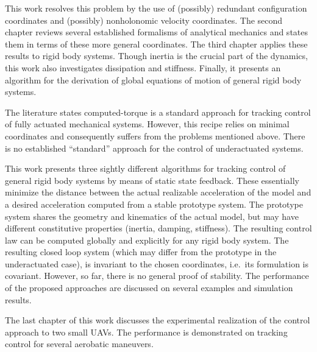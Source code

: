 This work resolves this problem by the use of (possibly) redundant configuration coordinates and (possibly) nonholonomic velocity coordinates.
The second chapter reviews several established formalisms of analytical mechanics and states them in terms of these more general coordinates.
The third chapter applies these results to rigid body systems.
Though inertia is the crucial part of the dynamics, this work also investigates dissipation and stiffness.
Finally, it presents an algorithm for the derivation of global equations of motion of general rigid body systems.

The literature states computed-torque is a standard approach for tracking control of fully actuated mechanical systems.
However, this recipe relies on minimal coordinates and consequently suffers from the problems mentioned above.
There is no established ``standard'' approach for the control of underactuated systems.

This work presents three sightly different algorithms for tracking control of general rigid body systems by means of static state feedback.
These essentially minimize the distance between the actual realizable acceleration of the model and a desired acceleration computed from a stable prototype system.
The prototype system shares the geometry and kinematics of the actual model, but may have different constitutive properties (inertia, damping, stiffness).
The resulting control law can be computed globally and explicitly for any rigid body system.
The resulting closed loop system (which may differ from the prototype in the underactuated case), is invariant to the chosen coordinates, i.e.\ its formulation is covariant.
However, so far, there is no general proof of stability.
The performance of the proposed approaches are discussed on several examples and simulation results.

The last chapter of this work discusses the experimental realization of the control approach to two small UAVs.
The performance is demonstrated on tracking control for several aerobatic maneuvers.

